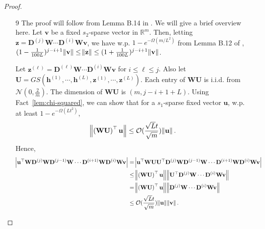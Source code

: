 \begin{proof}
\begin{enumerate}
\begin{equation*}
		\end{equation*}
		The proof will follow from using an $\epsilon$-net over $\mathbb{R}^{d}$ to quantify for all vectors $\mathbf{u}$.
		\item[9] The proof will follow from Lemma B.14 in \cite{allen2019convergence_rnn}. We will give a brief overview here. Let $\mathbf{v}$ be a fixed $s_2$-sparse vector in $\mathbb{R}^{m}$.  Then, letting $\mathbf{z} =  \mathbf{D}^{(j)} \mathbf{W}  \cdots  \mathbf{D}^{(i)} \mathbf{W} \mathbf{v}$, we have w.p. $1-e^{-\Omega(m/L^2)}$ from Lemma B.12 of \cite{allen2019convergence_rnn}, $(1 - \frac{1}{100L})^{j-i + 1} \norm{\mathbf{v}} \le \norm{\mathbf{z}} \le (1 + \frac{1}{100L})^{j-i + 1} \norm{\mathbf{v}}$. 
		
		Let $\mathbf{z}^{(\ell)} =  \mathbf{D}^{(\ell)} \mathbf{W}  \cdots  \mathbf{D}^{(i)} \mathbf{W} \mathbf{v}$ for $i \le \ell \le j$. Also let $\mathbf{U}=G S\left(\mathbf{h}^{(1)}, \cdots, \mathbf{h}^{(L)}, \mathbf{z}^{(1)}, \cdots, \mathbf{z}^{(L)}\right)$.
		Each entry of $\mathbf{W} \mathbf{U}$ is i.i.d. from $\mathcal{N}\left(0, \frac{2}{m}\right).$ The dimension of $\mathbf{W}\mathbf{U}$ is $(m, j - i + 1 + L)$. Using Fact~\ref{lem:chi-squared}, we can show that for a $s_1$-sparse fixed vector $\mathbf{u}$, w.p. at least $1 - e^{-\Omega(Lt^2)}$,
		\begin{align*}
			\norm{\left(\mathbf{W}\mathbf{U}\right)^{\top} \mathbf{u}} \le \mathcal{O}(\frac{\sqrt{L}t}{\sqrt{m}} )\norm{\mathbf{u}}.
		\end{align*}
		Hence,
		\begin{align*}
			\abs{\mathbf{u}^{\top} \mathbf{W} \mathbf{D}^{(j)} \mathbf{W} \mathbf{D}^{(j-1)} \mathbf{W} \cdots \mathbf{D}^{(i+1)} \mathbf{W} \mathbf{D}^{(i)} \mathbf{W} \mathbf{v}} 
			&=  \abs{\mathbf{u}^{\top} \mathbf{W} \mathbf{U} \mathbf{U}^{\top} \mathbf{D}^{(j)} \mathbf{W} \mathbf{D}^{(j-1)} \mathbf{W} \cdots \mathbf{D}^{(i+1)} \mathbf{W} \mathbf{D}^{(i)} \mathbf{W} \mathbf{v}} 
			\\&\le \norm{\left(\mathbf{W}\mathbf{U}\right)^{\top} \mathbf{u}} \norm{\mathbf{U}^{\top} \mathbf{D}^{(j)} \mathbf{W}  \cdots  \mathbf{D}^{(i)} \mathbf{W} \mathbf{v}} \\&
			= \norm{\left(\mathbf{W}\mathbf{U}\right)^{\top} \mathbf{u}} \norm{ \mathbf{D}^{(j)} \mathbf{W}  \cdots  \mathbf{D}^{(i)} \mathbf{W} \mathbf{v}}\\&
			\le \mathcal{O}(\frac{\sqrt{L}t}{\sqrt{m}}) \norm{\mathbf{u}} \norm{\mathbf{v}}.
		\end{align*}
		

\end{enumerate}
\end{proof}
